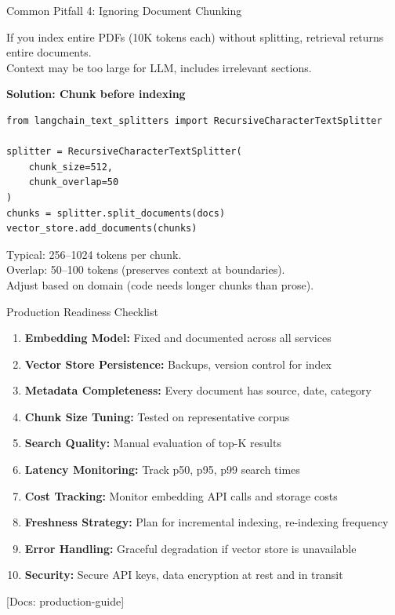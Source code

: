 \documentclass[aspectratio=169,11pt]{beamer}
\newcommand{\docref}[1]{{\scriptsize\color{docgray}[Docs: #1]}}
\begin{document}
\begin{frame}[fragile]{Common Pitfall 4: Ignoring Document Chunking}
  \begin{warningbox}[Problem]
    If you index entire PDFs (10K tokens each) without splitting, retrieval returns entire documents.\\
    Context may be too large for LLM, includes irrelevant sections.
  \end{warningbox}

  \vspace{0.05cm}
  \textbf{Solution: Chunk before indexing}
  \begin{lstlisting}[basicstyle=\ttfamily\tiny]
from langchain_text_splitters import RecursiveCharacterTextSplitter

splitter = RecursiveCharacterTextSplitter(
    chunk_size=512,
    chunk_overlap=50
)
chunks = splitter.split_documents(docs)
vector_store.add_documents(chunks)
  \end{lstlisting}

  \begin{tipbox}
    Typical: 256--1024 tokens per chunk.\\
    Overlap: 50--100 tokens (preserves context at boundaries).\\
    Adjust based on domain (code needs longer chunks than prose).
  \end{tipbox}
\end{frame}

\begin{frame}{Production Readiness Checklist}
  \begin{enumerate}
    \setlength{\itemsep}{0pt}
    \item \textbf{Embedding Model:} Fixed and documented across all services
    \item \textbf{Vector Store Persistence:} Backups, version control for index
    \item \textbf{Metadata Completeness:} Every document has source, date, category
    \item \textbf{Chunk Size Tuning:} Tested on representative corpus
    \item \textbf{Search Quality:} Manual evaluation of top-K results
    \item \textbf{Latency Monitoring:} Track p50, p95, p99 search times
    \item \textbf{Cost Tracking:} Monitor embedding API calls and storage costs
    \item \textbf{Freshness Strategy:} Plan for incremental indexing, re-indexing frequency
    \item \textbf{Error Handling:} Graceful degradation if vector store is unavailable
    \item \textbf{Security:} Secure API keys, data encryption at rest and in transit
  \end{enumerate}

  \vspace{0.05cm}
  \docref{production-guide}
\end{frame}
\end{document}
